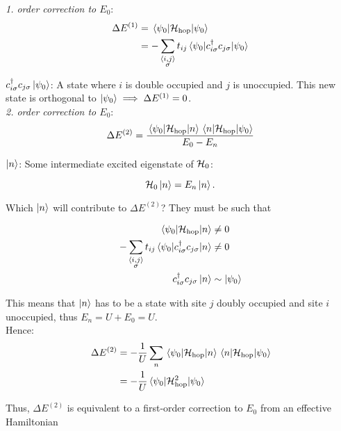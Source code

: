 \emph{1. order correction to $E_0$}:
\begin{align}
    \Delta E^{(1)} &= \mel{\psi_0}{\mathcal{H}_{\text{hop}}}{\psi_0} \\
    &= - \sum_{\substack{\langle i, j \rangle \\ \sigma}} t_{ij} \mel{\psi_0}{c_{i\sigma}^\dagger c_{j\sigma}}{\psi_0}
\end{align}

 $c_{i\sigma}^\dagger c_{j\sigma}\ket{{\psi_0}}$: A state where $i$ is double occupied and $j$ is unoccupied. This new state is orthogonal to $\ket{\psi_0} \implies \Delta E^{(1)} = 0$. \\

\emph{2. order correction to $E_0$}:
\begin{equation}
    \Delta E^{(2)} = \frac{\mel{\psi_0}{\mathcal{H}_{\text{hop}}}{n} \mel{n}{\mathcal{H}_{\text{hop}}}{\psi_0}}{E_0 - E_n}
\end{equation}

$\ket{n}$: Some intermediate excited eigenstate of $\mathcal{H}_0$:

\begin{equation}
    \mathcal{H}_0\ket{n} = E_n\ket{n}.
\end{equation}

Which $\ket{n}$ will contribute to $\Delta E^{(2)}$? They must be such that

\begin{align}
    \mel{\psi_0}{\mathcal{H}_{\text{hop}}}{n} &\ne 0 \\
    - \sum_{\substack{\langle i, j \rangle \\ \sigma}} t_{ij} \mel{\psi_0}{c_{i\sigma}^\dagger c_{j\sigma}}{n} & \ne 0 \\
    c_{i \sigma}^\dagger c_{j \sigma}\ket{n} & \sim \ket{\psi_0}
\end{align}

This means that $\ket{n}$ has to be a state with site $j$ doubly occupied and site $i$ unoccupied, thus $E_n = U + E_0 = U$.\\

Hence:
\begin{align}
    \Delta E^{(2)} &= -\frac{1}{U}\sum_n \mel{\psi_0}{\mathcal{H}_{\text{hop}}}{n}\mel{n}{\mathcal{H}_{\text{hop}}}{\psi_0} \\
    &= -\frac{1}{U} \mel{\psi_0}{\mathcal{H}_{\text{hop}}^2}{\psi_0}
\end{align}

Thus, $\Delta E^{(2)}$ is equivalent to a first-order correction to $E_0$ from an effective Hamiltonian

